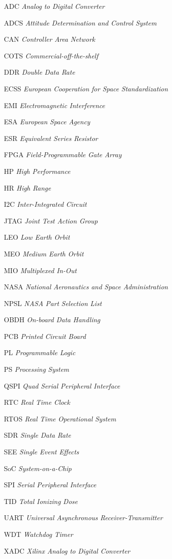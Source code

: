 \documentclass[
12pt,				%
oneside,			%
a4paper,			%
chapter=TITLE,		%
section=TITLE,		%
english,			%
brazil				%
hyperref=hidelinks]{abntex2}
\begin{document}
\begin{siglas}
	\item[ADC] \textit{Analog to Digital Converter}
	\item[ADCS] \textit{Attitude Determination and Control System}
	\item[CAN] \textit{Controller Area Network}
	\item[COTS] \textit{Commercial-off-the-shelf}
	\item[DDR] \textit{Double Data Rate}
	\item[ECSS] \textit{European Cooperation for Space Standardization}
	\item[EMI] \textit{Electromagnetic Interference}
	\item[ESA] \textit{European Space Agency}
	\item[ESR] \textit{Equivalent Series Resistor}
	\item[FPGA] \textit{Field-Programmable Gate Array}
	\item[HP] \textit{High Performance} 
	\item[HR] \textit{High Range}
	\item[I2C] \textit{Inter-Integrated Circuit}
	\item[JTAG] \textit{Joint Test Action Group}
	\item[LEO] \textit{Low Earth Orbit}
	\item[MEO] \textit{Medium Earth Orbit}
	\item[MIO] \textit{Multiplexed In-Out}
	\item[NASA] \textit{National Aeronautics and Space Administration}
	\item[NPSL] \textit{NASA Part Selection List}
	\item[OBDH] \textit{On-board Data Handling} 
	\item[PCB] \textit{Printed Circuit Board}
	\item[PL] \textit{Programmable Logic}
	\item[PS] \textit{Processing System}
	\item[QSPI] \textit{Quad Serial Peripheral Interface}
	\item[RTC] \textit{Real Time Clock}
	\item[RTOS] \textit{Real Time Operational System}
	\item[SDR] \textit{Single Data Rate}
	\item[SEE] \textit{Single Event Effects}
	\item[SoC] \textit{System-on-a-Chip}
	\item[SPI] \textit{Serial Peripheral Interface}
	\item[TID] \textit{Total Ionizing Dose}
	\item[UART] \textit{Universal Asynchronous Receiver-Transmitter}
	\item[WDT] \textit{Watchdog Timer}	
	\item[XADC] \textit{Xilinx Analog to Digital Converter}
\end{siglas}
\end{document}
